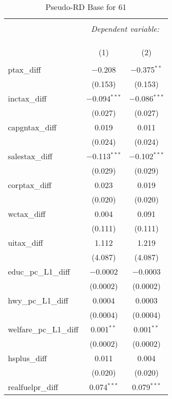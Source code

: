 
\begin{table}[!htbp] \centering 
  \caption{Pseudo-RD Base for  61} 
  \label{} 
\begin{tabular}{@{\extracolsep{5pt}}lcc} 
\\[-1.8ex]\hline 
\hline \\[-1.8ex] 
 & \multicolumn{2}{c}{\textit{Dependent variable:}} \\ 
\cline{2-3} 
\\[-1.8ex] & \multicolumn{2}{c}{ } \\ 
\\[-1.8ex] & (1) & (2)\\ 
\hline \\[-1.8ex] 
 ptax\_diff & $-$0.208 & $-$0.375$^{**}$ \\ 
  & (0.153) & (0.153) \\ 
  inctax\_diff & $-$0.094$^{***}$ & $-$0.086$^{***}$ \\ 
  & (0.027) & (0.027) \\ 
  capgntax\_diff & 0.019 & 0.011 \\ 
  & (0.024) & (0.024) \\ 
  salestax\_diff & $-$0.113$^{***}$ & $-$0.102$^{***}$ \\ 
  & (0.029) & (0.029) \\ 
  corptax\_diff & 0.023 & 0.019 \\ 
  & (0.020) & (0.020) \\ 
  wctax\_diff & 0.004 & 0.091 \\ 
  & (0.111) & (0.111) \\ 
  uitax\_diff & 1.112 & 1.219 \\ 
  & (4.087) & (4.087) \\ 
  educ\_pc\_L1\_diff & $-$0.0002 & $-$0.0003 \\ 
  & (0.0002) & (0.0002) \\ 
  hwy\_pc\_L1\_diff & 0.0004 & 0.0003 \\ 
  & (0.0004) & (0.0004) \\ 
  welfare\_pc\_L1\_diff & 0.001$^{**}$ & 0.001$^{**}$ \\ 
  & (0.0002) & (0.0002) \\ 
  hsplus\_diff & 0.011 & 0.004 \\ 
  & (0.020) & (0.020) \\ 
  realfuelpr\_diff & 0.074$^{***}$ & 0.079$^{***}$ \\ 

\end{tabular}
\end{table}

